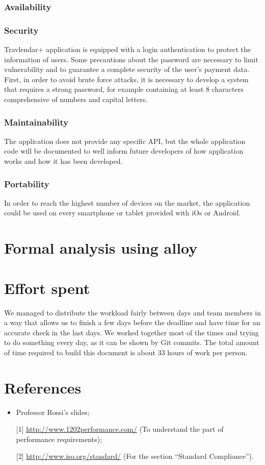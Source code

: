\documentclass[12pt,titlepage]{article}
\begin{document}
\subsubsection{Availability}\label{sec:mod1}
\subsubsection{Security}\label{sec:mod1}

Travlendar+ application is equipped with a login authentication to protect the information of users. Some precautions about the password are necessary to limit vulnerability and to guarantee a complete security of the user's payment data. First, in order to avoid brute force attacks, it is necessary to develop a system that requires a strong password, for example containing at least 8 characters comprehensive of numbers and capital letters.



\subsubsection{Maintainability}\label{sec:mod1}
The application does not provide any specific API, but the whole application code will be documented to well inform future developers of how application works and how it has been developed. 

\subsubsection{Portability}\label{sec:mod1}
In order to reach the highest number of devices on the market, the application could be used on every smartphone or tablet provided with iOs or Android. 
\pagebreak
\section{Formal analysis using alloy}\label{sec:crit}
\pagebreak
\section{Effort spent}\label{sec:crit}
We managed to distribute the workload fairly between days and team members in a way that allows us to finish a few days before the deadline and have time for an accurate check in the last days.
We worked together most of the times and trying to do something every day, as it can be shown by Git commits.
The total amount of time required to build this document is about 33 hours of work per person.
\pagebreak

\section{References}\label{sec:crit}
\begin{itemize}
\item Professor Rossi's slides;
\item [{[1]}] \url{http://www.1202performance.com/} (To understand the part of performance requirements);
\item [{[2]}] \url{http://www.iso.org/standard/} (For the section ``Standard Compliance'').
\end{itemize}
\end{document}
